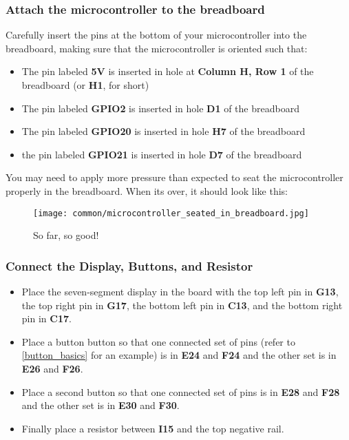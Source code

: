 \subsubsection{Attach the microcontroller to the breadboard}
Carefully insert the pins at the bottom of your microcontroller into the breadboard, making sure that the microcontroller is oriented such that:
\begin{itemize}
    \item The pin labeled \textbf{5V} is inserted in hole at \textbf{Column H, Row 1} of the breadboard (or \textbf{H1}, for short)
    \item The pin labeled \textbf{GPIO2} is inserted in hole \textbf{D1} of the breadboard
    \item The pin labeled \textbf{GPIO20} is inserted in hole \textbf{H7} of the breadboard
    \item the pin labeled \textbf{GPIO21} is inserted in hole \textbf{D7} of the breadboard
\end{itemize}
You may need to apply more pressure than expected to seat the microcontroller properly in the breadboard. When its over, it should look like this:

\begin{figure}[H]
    \centering
    \texttt{[image: common/microcontroller\_seated\_in\_breadboard.jpg]}
    \caption{So far, so good!}
\end{figure}

\subsubsection{Connect the Display, Buttons, and Resistor}
\begin{itemize}
    \item Place the seven-segment display in the board with the top left pin in \textbf{G13}, the top right pin
    in \textbf{G17}, the bottom left pin in \textbf{C13}, and the bottom right pin in \textbf{C17}.
    \item Place a button button so that one connected set of pins (refer to \ref{button_basics} for an example) is in \textbf{E24}
    and \textbf{F24} and the other set is in \textbf{E26} and \textbf{F26}.
    \item Place a second button so that one connected set of pins is in \textbf{E28} and \textbf{F28}
    and the other set is in \textbf{E30} and \textbf{F30}.
    \item Finally place a resistor between \textbf{I15} and the top negative rail.
\end{itemize}

